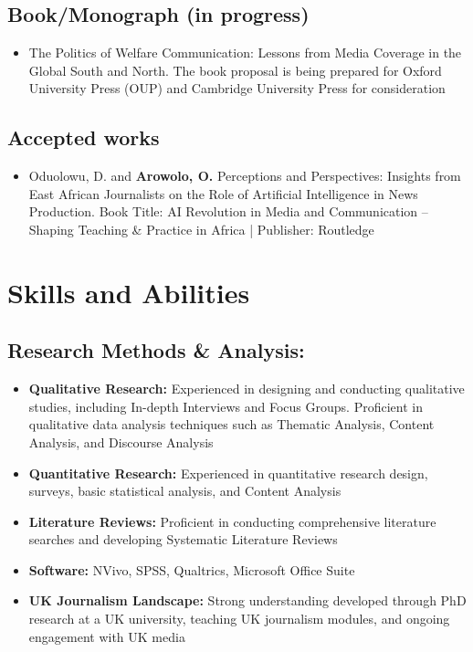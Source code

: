 \documentclass[a4paper,11pt]{article}
\newcommand{\resumeItem}[1]{
  \item\small{
    {#1 \vspace{-2pt}}
  }
}
\newcommand{\resumeItemListStart}{\begin{itemize}}
\newcommand{\resumeItemListEnd}{\end{itemize}\vspace{-5pt}}
\begin{document}
\subsection{Book/Monograph (in progress)}
    \resumeItemListStart
        \resumeItem{The Politics of Welfare Communication: Lessons from Media Coverage in the Global South and North. The book proposal is being prepared for Oxford University Press (OUP) and Cambridge University Press for consideration}
    \resumeItemListEnd

\subsection{Accepted works}
    \resumeItemListStart
        \resumeItem{Oduolowu, D. and \textbf{Arowolo, O.} Perceptions and Perspectives: Insights from East African Journalists on the Role of Artificial Intelligence in News Production. Book Title: AI Revolution in Media and Communication – Shaping Teaching \& Practice in Africa | Publisher: Routledge}
    \resumeItemListEnd

\section{Skills and Abilities}
\subsection{Research Methods \& Analysis:}
    \resumeItemListStart
        \resumeItem{\textbf{Qualitative Research:} Experienced in designing and conducting qualitative studies, including In-depth Interviews and Focus Groups. Proficient in qualitative data analysis techniques such as Thematic Analysis, Content Analysis, and Discourse Analysis}
        \resumeItem{\textbf{Quantitative Research:} Experienced in quantitative research design, surveys, basic statistical analysis, and Content Analysis}
        \resumeItem{\textbf{Literature Reviews:} Proficient in conducting comprehensive literature searches and developing Systematic Literature Reviews}
        \resumeItem{\textbf{Software:} NVivo, SPSS, Qualtrics, Microsoft Office Suite}
        \resumeItem{\textbf{UK Journalism Landscape:} Strong understanding developed through PhD research at a UK university, teaching UK journalism modules, and ongoing engagement with UK media}
    \resumeItemListEnd
\end{document}

